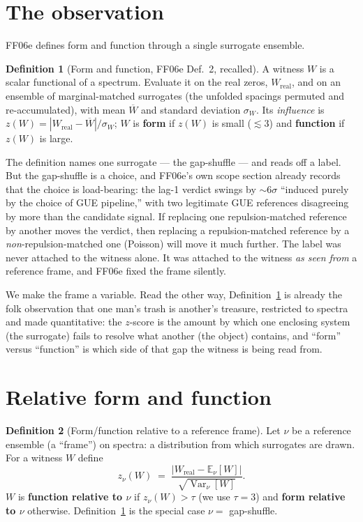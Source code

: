 \documentclass[11pt]{article}
\theoremstyle{definition}
\newtheorem{definition}{Definition}
\theoremstyle{plain}
\newcommand{\real}{\mathrm{real}}
\begin{document}
\section{The observation}\label{sec:obs}

FF06e defines form and function through a single surrogate ensemble.

\begin{definition}[Form and function, FF06e Def.~2, recalled]\label{def:ff-single}
A witness $W$ is a scalar functional of a spectrum. Evaluate it on the real zeros, $W_\real$, and on an ensemble of marginal-matched surrogates (the unfolded spacings permuted and re-accumulated), with mean $\overline{W}$ and standard deviation $\sigma_W$. Its \emph{influence} is $z(W)=|W_\real-\overline{W}|/\sigma_W$; $W$ is \textbf{form} if $z(W)$ is small ($\lesssim 3$) and \textbf{function} if $z(W)$ is large.
\end{definition}

The definition names one surrogate --- the gap-shuffle --- and reads off a label. But the gap-shuffle is a choice, and FF06e's own scope section already records that the choice is load-bearing: the lag-1 verdict swings by $\sim\!6\sigma$ ``induced purely by the choice of GUE pipeline,'' with two legitimate GUE references disagreeing by more than the candidate signal. If replacing one repulsion-matched reference by another moves the verdict, then replacing a repulsion-matched reference by a \emph{non}-repulsion-matched one (Poisson) will move it much further. The label was never attached to the witness alone. It was attached to the witness \emph{as seen from} a reference frame, and FF06e fixed the frame silently.

We make the frame a variable. Read the other way, Definition~\ref{def:ff-single} is already the folk observation that one man's trash is another's treasure, restricted to spectra and made quantitative: the $z$-score is the amount by which one enclosing system (the surrogate) fails to resolve what another (the object) contains, and ``form'' versus ``function'' is which side of that gap the witness is being read from.

\section{Relative form and function}\label{sec:rel}

\begin{definition}[Form/function relative to a reference frame]\label{def:ff-rel}
Let $\nu$ be a reference ensemble (a ``frame'') on spectra: a distribution from which surrogates are drawn. For a witness $W$ define
\[
  z_\nu(W)\;=\;\frac{\big|W_\real-\mathbb{E}_\nu[W]\big|}{\sqrt{\operatorname{Var}_\nu[W]}}.
\]
$W$ is \textbf{function relative to $\nu$} if $z_\nu(W)>\tau$ (we use $\tau=3$) and \textbf{form relative to $\nu$} otherwise. Definition~\ref{def:ff-single} is the special case $\nu=$ gap-shuffle.
\end{definition}
\end{document}
